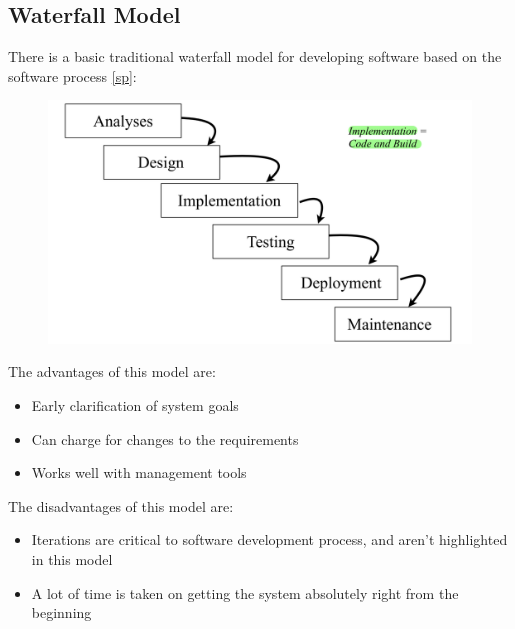 \documentclass{article}
\begin{document}
\subsection{Waterfall Model} \label{waterfall}
There is a basic traditional waterfall model for developing software based on the software process \eqref{sp}:
\begin{figure}[H]
    \centering
\includegraphics[width=0.6\linewidth]{Pictures/Screenshot 2023-02-08 at 12.13.38.png}
\end{figure}
The advantages of this model are:
\begin{itemize}
    \item Early clarification of system goals
    \item Can charge for changes to the requirements
    \item Works well with management tools
\end{itemize}
The disadvantages of this model are:
\begin{itemize}
    \item Iterations are critical to software development process, and aren't highlighted in this model
    \item A lot of time is taken on getting the system absolutely right from the beginning
\end{itemize}
\end{document}
